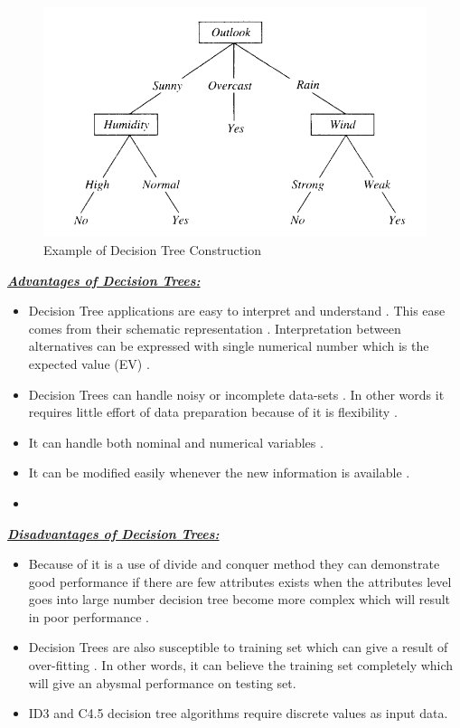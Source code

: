 \documentclass[sigconf]{acmart}
\begin{document}
 \begin{figure}[!ht]
  \centering
      \includegraphics[width=\columnwidth]{images/decison_tree.png}
  \caption{Example of Decision Tree Construction\cite{www-cs.princeton}}\label{fig:Decision Tree}
\end{figure}

\textbf{\underline{\textit{Advantages of Decision Trees:}}}

\begin{itemize}
\item Decision Tree applications are easy to interpret and understand \cite{www-cs.ubb}. This ease comes from their schematic representation \cite{www-cs.ubb}. Interpretation between alternatives can be expressed with single numerical number which is the expected value (EV) \cite{www-cs.ubb}.  
\item Decision Trees can handle noisy or incomplete data-sets \cite{www-cs.ubb}. In other words it requires little effort of data preparation because of it is flexibility \cite{www-simafore}.  
\item It can handle both nominal and numerical variables \cite{www-cs.ubb}.
\item It can be modified easily whenever the new information is available \cite{www-cs.ubb}.
\item 
\end{itemize}


\textbf{\underline{\textit{Disadvantages of Decision Trees:}}}

\begin{itemize}
\item Because of it is a use of divide and conquer method they can demonstrate good performance if there are few attributes exists when the attributes level goes into large number decision tree become more complex which will result in poor performance \cite{www-cs.ubb}.
\item Decision Trees are also susceptible to training set which can give a result of over-fitting \cite{www-cs.ubb}. In other words, it can believe the training set completely which will give an abysmal performance on testing set.
\item ID3 and C4.5 decision tree algorithms require discrete values as input data. 
\end{itemize}
\end{document}
